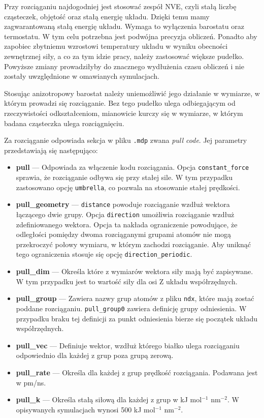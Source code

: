 Przy rozciąganiu najdogodniej jest stosować zespół NVE, czyli stałą liczbę cząsteczek, objętość oraz stałą energię układu. Dzięki temu mamy zagwarantowaną stałą energię układu. Wymaga to wyłączenia barostatu oraz termostatu. W tym celu potrzebna jest podwójna precyzja obliczeń. Ponadto aby zapobiec zbytniemu wzrostowi temperatury układu w wyniku obecności zewnętrznej siły, a co za tym idzie pracy, należy zastosować większe pudełko. Powyższe zmiany prowadziłyby do znacznego wydłużenia czasu obliczeń i nie zostały uwzględnione w omawianych symulacjach.

Stosując anizotropowy barostat należy uniemożliwić jego działanie w wymiarze, w którym prowadzi się rozciąganie. Bez tego pudełko ulega odbiegającym od rzeczywistości odkształceniom, mianowicie kurczy się w wymiarze, w którym badana cząsteczka ulega rozciągnięciu.

Za rozciąganie odpowiada sekcja w pliku \texttt{.mdp} zwana \textit{pull code}. Jej parametry przedstawiają się następująco:
\begin{itemize}
\item \textbf{pull} --- Odpowiada za włączenie kodu rozciągania. Opcja \texttt{constant\_force} sprawia, że rozciąganie odbywa się przy stałej sile. W tym przypadku zastosowano opcję \texttt{umbrella}, co pozwala na stosowanie stałej prędkości.
\item \textbf{pull\_geometry} --- \texttt{distance} powoduje rozciąganie wzdłuż wektora łączącego dwie grupy. Opcja \texttt{direction} umożliwia rozciąganie wzdłuż zdefiniowanego wektora. Opcja ta nakłada ograniczenie powodujące, że odległości pomiędzy dwoma rozciąganymi grupami atomów nie mogą przekroczyć połowy wymiaru, w którym zachodzi rozciąganie. Aby uniknąć tego ograniczenia stosuje się opcję \texttt{direction\_periodic}.
\item \textbf{pull\_dim} --- Określa które z wymiarów wektora siły mają być zapisywane. W tym przypadku jest to wartość siły dla osi Z układu współrzędnych.
\item \textbf{pull\_group} --- Zawiera nazwy grup atomów z pliku \texttt{ndx}, które mają zostać poddane rozciąganiu. \texttt{pull\_group0} zawiera definicję grupy odniesienia. W przypadku braku tej definicji za punkt odniesienia bierze się początek układu współrzędnych.
\item \textbf{pull\_vec} --- Definiuje wektor, wzdłuż którego białko ulega rozciąganiu odpowiednio dla każdej z grup poza grupą zerową.
\item \textbf{pull\_rate} --- Określa dla każdej z grup prędkość rozciągania. Podawana jest w pm/ns.
\item \textbf{pull\_k} --- Określa stałą siłową dla każdej z grup w kJ mol$^{-1}$ nm$^{-2}$. W opisywanych symulacjach wynosi 500 kJ mol$^{-1}$ nm$^{-2}$.
\end{itemize}

